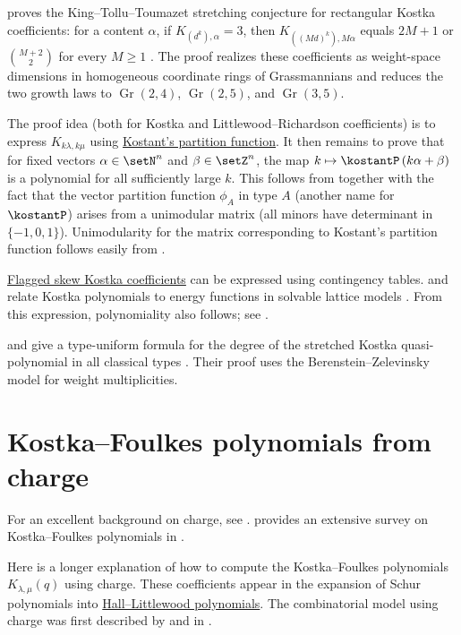  proves the King--Tollu--Toumazet stretching
conjecture for rectangular Kostka coefficients: for a content $\alpha$, if
$K_{(d^k),\alpha}=3$, then
$K_{((Md)^k),M\alpha}$ equals $2M+1$ or $\binom{M+2}{2}$ for every
$M\geq1$ \cite{Prasad2026x}.  The proof realizes these coefficients as
weight-space dimensions in homogeneous coordinate rings of Grassmannians and
reduces the two growth laws to $\operatorname{Gr}(2,4)$,
$\operatorname{Gr}(2,5)$, and $\operatorname{Gr}(3,5)$.

The proof idea (both for Kostka and Littlewood--Richardson coefficients)
is to express $K_{k\lambda,k\mu}$ using \hyperref[kostkaFromKostant]{Kostant's partition function}.
It then remains to prove that
for fixed vectors $\alpha \in \setN^n$ and $\beta \in \setZ^n$,
the map $k \mapsto \kostantP\left( k \alpha + \beta \right)$ is
a polynomial for all sufficiently large $k$.
This follows from \cite[Thm.~1]{Sturmfels1995} together with the fact that the
vector partition function $\phi_A$ in type $A$ (another name for $\kostantP$)
arises from a unimodular matrix (all minors have determinant in $\{-1,0,1\}$).
Unimodularity for the matrix corresponding to Kostant's partition function
follows easily from \cite[Appendix]{HellerTompkins1957}.


\hyperref[schurFlagged]{Flagged skew Kostka coefficients} can be expressed using contingency tables.
 and  relate Kostka
polynomials to energy functions in solvable lattice models
\cite{NakayashikiYamada1995x}.
From this expression, polynomiality also follows; see
\cite{AlexanderssonOguz2023x}.

 and  give a type-uniform formula for the
degree of the stretched Kostka quasi-polynomial in all classical types
\cite{GaoGao2024}.  Their proof uses the Berenstein--Zelevinsky model for
weight multiplicities.


\section[kostkaFoulkes]{Kostka--Foulkes polynomials from charge}

For an excellent background on charge, see \cite[Ch.~2.4]{Butler1994}.
 provides an extensive survey on Kostka--Foulkes
polynomials in \cite{Kirillov2001}.

Here is a longer explanation of how to compute the Kostka--Foulkes
polynomials $K_{\lambda,\mu}(q)$ using charge.
These coefficients appear in the expansion of Schur polynomials into
\hyperref[hallLittlewoodP]{Hall--Littlewood polynomials}.
The combinatorial model using charge was first described by
 and
in \cite{LascouxSchutzenberger78}.

